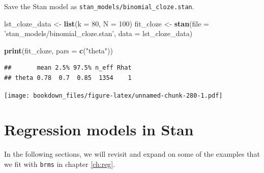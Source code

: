 \documentclass[12pt,]{krantz}
\newenvironment{Shaded}{\begin{snugshade}}{\end{snugshade}}
\newcommand{\DataTypeTok}[1]{\textcolor[rgb]{0.13,0.29,0.53}{#1}}
\newcommand{\DecValTok}[1]{\textcolor[rgb]{0.00,0.00,0.81}{#1}}
\newcommand{\KeywordTok}[1]{\textcolor[rgb]{0.13,0.29,0.53}{\textbf{#1}}}
\newcommand{\NormalTok}[1]{#1}
\newcommand{\OperatorTok}[1]{\textcolor[rgb]{0.81,0.36,0.00}{\textbf{#1}}}
\newcommand{\StringTok}[1]{\textcolor[rgb]{0.31,0.60,0.02}{#1}}
\theoremstyle{definition}
\theoremstyle{definition}
\theoremstyle{definition}
\theoremstyle{remark}
\begin{document}
Save the Stan model as \texttt{stan\_models/binomial\_cloze.stan}.

\begin{Shaded}
\begin{Highlighting}[]
\NormalTok{lst_cloze_data <-}\StringTok{  }\KeywordTok{list}\NormalTok{(}\DataTypeTok{k =} \DecValTok{80}\NormalTok{, }\DataTypeTok{N =} \DecValTok{100}\NormalTok{)}
\NormalTok{fit_cloze <-}\StringTok{ }\KeywordTok{stan}\NormalTok{(}\DataTypeTok{file =} \StringTok{'stan_models/binomial_cloze.stan'}\NormalTok{,}
                  \DataTypeTok{data =}\NormalTok{ lst_cloze_data)}
\end{Highlighting}
\end{Shaded}

\begin{Shaded}
\begin{Highlighting}[]
\KeywordTok{print}\NormalTok{(fit_cloze, }\DataTypeTok{pars =} \KeywordTok{c}\NormalTok{(}\StringTok{"theta"}\NormalTok{)) }
\end{Highlighting}
\end{Shaded}

\begin{verbatim}
##       mean 2.5% 97.5% n_eff Rhat
## theta 0.78  0.7  0.85  1354    1
\end{verbatim}

\begin{Shaded}
\end{Shaded}

\texttt{[image: bookdown\_files/figure-latex/unnamed-chunk-280-1.pdf]}

\hypertarget{regression-models-in-stan}{%
\section{Regression models in Stan}\label{regression-models-in-stan}}

In the following sections, we will revisit and expand on some of the examples that we fit with \texttt{brms} in chapter \ref{ch:reg}.
\end{document}

